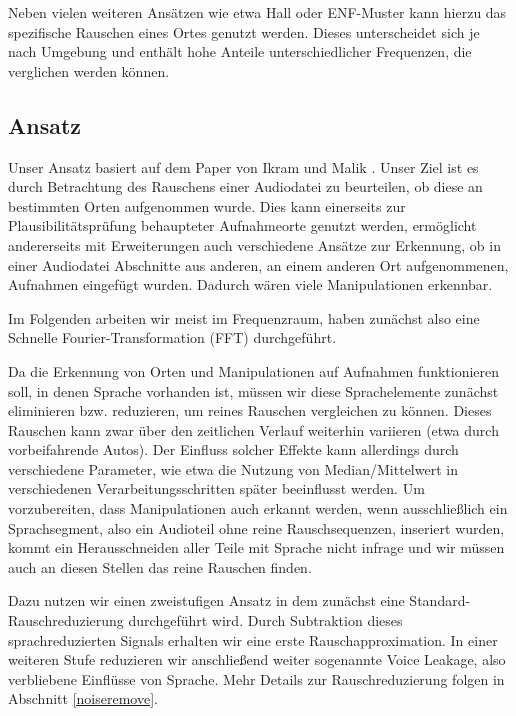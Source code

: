 \documentclass[
	fontsize=10.5pt,
	marginpar=false,
	ngerman,
	accentcolor=3d
	]{tudapub}
\begin{document}
Neben vielen weiteren Ansätzen wie etwa Hall oder ENF-Muster kann hierzu das spezifische Rauschen eines Ortes genutzt werden. Dieses unterscheidet sich je nach Umgebung und enthält hohe Anteile unterschiedlicher Frequenzen, die verglichen werden können.

\subsection{Ansatz}

Unser Ansatz basiert auf dem Paper von Ikram und Malik \cite{ikram_digital_2010}. Unser Ziel ist es durch Betrachtung des Rauschens einer Audiodatei zu beurteilen, ob diese an bestimmten Orten aufgenommen wurde. Dies kann einerseits zur Plausibilitätsprüfung behaupteter Aufnahmeorte genutzt werden, ermöglicht andererseits mit Erweiterungen auch verschiedene Ansätze zur Erkennung, ob in einer Audiodatei Abschnitte aus anderen, an einem anderen Ort aufgenommenen, Aufnahmen eingefügt wurden. Dadurch wären viele Manipulationen erkennbar.

Im Folgenden arbeiten wir meist im Frequenzraum, haben zunächst also eine Schnelle Fourier-Transformation (FFT) durchgeführt.

Da die Erkennung von Orten und Manipulationen auf Aufnahmen funktionieren soll, in denen Sprache vorhanden ist, müssen wir diese Sprachelemente zunächst eliminieren bzw. reduzieren, um reines Rauschen vergleichen zu können. Dieses Rauschen kann zwar über den zeitlichen Verlauf weiterhin variieren (etwa durch vorbeifahrende Autos). Der Einfluss solcher Effekte kann allerdings durch verschiedene Parameter, wie etwa die Nutzung von Median/Mittelwert in verschiedenen Verarbeitungsschritten später beeinflusst werden. Um vorzubereiten, dass Manipulationen auch erkannt werden, wenn ausschließlich ein Sprachsegment, also ein Audioteil ohne reine Rauschsequenzen, inseriert wurden, kommt ein Herausschneiden aller Teile mit Sprache nicht infrage und wir müssen auch an diesen Stellen das reine Rauschen finden.

Dazu nutzen wir einen zweistufigen Ansatz in dem zunächst eine Standard-Rauschreduzierung durchgeführt wird. Durch Subtraktion dieses sprachreduzierten Signals erhalten wir eine erste Rauschapproximation. In einer weiteren Stufe reduzieren wir anschließend weiter sogenannte Voice Leakage, also verbliebene Einflüsse von Sprache. Mehr Details zur Rauschreduzierung folgen in Abschnitt \ref{noiseremove}.
\end{document}
